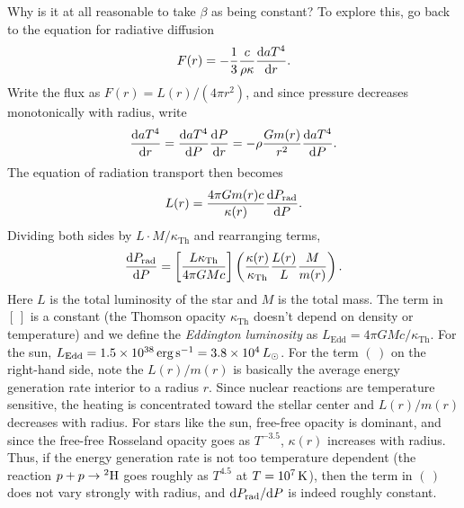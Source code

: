 Why is it at all reasonable to take $\beta$ as being constant? To explore this, go back to the equation for radiative diffusion
\[ F(r) = -\frac{1}{3}\frac{c}{\rho\kappa}\frac{\dif aT^{4}}{\dif r}. \]
Write the flux as $F(r) = L(r)/(4\pi r^{2})$, and since pressure decreases monotonically with radius, write
\[ 
\frac{\dif aT^{4}}{\dif r} = \frac{\dif aT^{4}}{\dif P}\frac{\dif P}{\dif r} = -\rho\frac{Gm(r)}{r^{2}}\frac{\dif aT^{4}}{\dif P}. 
\]
The equation of radiation transport then becomes
\[ L(r) = \frac{4\pi Gm(r) c}{\kappa(r)} \frac{\dif P_{\mathrm{rad}}}{\dif P}. \]
Dividing both sides by $L\cdot M/\kappa_{\mathrm{Th}}$ and rearranging terms,
\begin{equation}\label{e.Prad-P}
 \frac{\dif P_{\mathrm{rad}}}{\dif P} = \left[\frac{L\kappa_{\mathrm{Th}}}{4\pi GMc}\right]\left(\frac{\kappa(r)}{\kappa_{\mathrm{Th}}}\frac{L(r)}{L}\frac{M}{m(r)}\right).
\end{equation}
Here $L$ is the total luminosity of the star and $M$ is the total mass.  The term in $[\,]$ is a constant (the Thomson opacity $\kappa_{\mathrm{Th}}$ doesn't depend on density or temperature) and we define the \emph{Eddington luminosity} as $L_{\mathrm{Edd}}=4\pi GM c/\kappa_{\mathrm{Th}}$.  For the sun, $L_{\mathrm{Edd}} = 1.5\ee{38}\nsp\ergs\usp\second^{-1} = 3.8\ee{4}\nsp L_{\sun}$.  For the term $(\,)$ on the right-hand side, note the $L(r)/m(r)$ is basically the average energy generation rate interior to a radius $r$.  Since nuclear reactions are temperature sensitive, the heating is concentrated toward the stellar center and $L(r)/m(r)$ decreases with radius. For stars like the sun, free-free opacity is dominant, and since the free-free Rosseland opacity goes as $T^{-3.5}$, $\kappa(r)$ increases with radius.  Thus, if the energy generation rate is not too temperature dependent (the reaction $\pt + \pt \to \hydrogen[2]$ goes roughly as $T^{4.5}$ at $T=10^{7}\nsp\K$), then the term in $(\,)$  does not vary strongly with radius, and $\dif P_{\mathrm{rad}}/\dif P$ is indeed roughly constant. 



